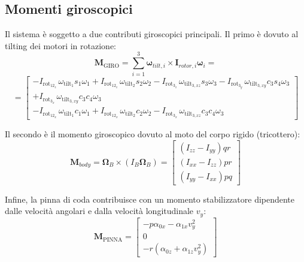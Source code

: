 \subsection{Momenti giroscopici}
Il sistema è soggetto a due contributi giroscopici principali. Il primo è dovuto al tilting dei motori in rotazione:
\begin{equation*}
    \bm{M}_{\text{GIRO}} = \sum_{i=1}^{3} \bm{\omega}_{tilt,i} \times \bm{I}_{rotor,i} \bm{\omega}_{i} \label{eq:M_giro_rotori} =
\end{equation*}
\begin{equation}
    =
    \begin{bmatrix}
        -I_{\text{rot}_{12_{z}}}\,\omega_{\text{tilt}_{1}} s_1 \omega_{1}
        + I_{\text{rot}_{12_{z}}}\,\omega_{\text{tilt}_{2}} s_2\omega_{2}
        - I_{\text{rot}_{3_{z}}}\,\omega_{\text{tilt}_{3,xz}} s_3 \omega_{3}
        - I_{\text{rot}_{3_{y}}}\,\omega_{\text{tilt}_{3,xy}} c_3 s_4 \omega_{3} \\[6pt]
        + I_{\text{rot}_{3_{x}}}\,\omega_{\text{tilt}_{3,xy}} c_3 c_4 \omega_{3} \\[6pt]
        -I_{\text{rot}_{12_{x}}}\,\omega_{\text{tilt}_{1}} c_1 \omega_{1}
        + I_{\text{rot}_{12_{x}}}\,\omega_{\text{tilt}_{2}} c_2 \omega_{2}
        - I_{\text{rot}_{3_{x}}}\,\omega_{\text{tilt}_{3,xz}} c_3 c_4 \omega_{3}
    \end{bmatrix}
\end{equation}


Il secondo è il momento giroscopico dovuto al moto del corpo rigido (tricottero):
\begin{equation}
    \bm{M}_{body} = \bm{\Omega}_{B} \times (I_B \bm{\Omega}_{B}) = \begin{bmatrix} (I_{zz}-I_{yy}) qr \\ (I_{xx}-I_{zz}) pr \\ (I_{yy}-I_{xx}) pq \end{bmatrix} \label{eq:M_body}
\end{equation}

Infine, la pinna di coda contribuisce con un momento stabilizzatore dipendente dalle velocità angolari e dalla velocità longitudinale $v_y$:
\begin{equation}
    \bm{M}_{\text{PINNA}} = \begin{bmatrix} -p\alpha_{0x} - \alpha_{1x}v_y^2 \\ 0 \\ -r(\alpha_{0z} + \alpha_{1z}v_y^2) \end{bmatrix} \label{eq:M_pinna}
\end{equation}

